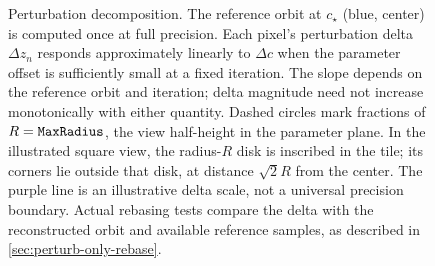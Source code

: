 \begin{figure}[!htbp]
\caption[Perturbation decomposition: spatial delta growth]{%
  Perturbation decomposition.  The reference orbit at $c_\star$
  (blue, center) is computed once at full precision.  Each pixel's
  perturbation delta $\Delta z_n$ responds approximately linearly to
  $\Delta c$ when the parameter offset is sufficiently small at a fixed
  iteration. The slope depends on the reference orbit and iteration;
  delta magnitude need not increase monotonically with either quantity.
  Dashed circles mark fractions of $R = \texttt{MaxRadius}$, the view
  half-height in the parameter plane. In the illustrated square view, the
  radius-$R$ disk is inscribed in the tile; its corners lie outside that disk,
  at distance $\sqrt{2}R$ from the center. The purple line is an illustrative
  delta scale, not a universal precision boundary. Actual rebasing tests
  compare the delta with the reconstructed orbit and available reference
  samples, as described in \cref{sec:perturb-only-rebase}.}
\label{fig:perturbation-delta}
\end{figure}

